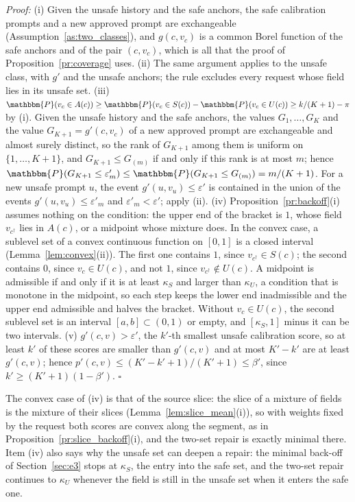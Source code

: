 \documentclass{article}
\newcommand{\PP}{\mathbbm{P}}
\theoremstyle{plain}
\theoremstyle{remark}
\begin{document}
\textit{Proof:}
(i) Given the unsafe history and the safe anchors, the safe calibration prompts and a new approved prompt are exchangeable
(Assumption~\ref{as:two_classes}), and $g(c,v_c)$ is a common Borel function of the safe anchors and of the pair $(c,v_c)$, which is all
that the proof of Proposition~\ref{pr:coverage} uses. (ii) The same argument applies to the unsafe class, with $g'$ and the unsafe anchors;
the rule excludes every request whose field lies in its unsafe set.
(iii) $\PP(v_c\in A(c))\ge\PP(v_c\in S(c))-\PP(v_c\in U(c))\ge k/(K+1)-\pi$ by (i). Given the unsafe history and the safe anchors, the
values $G_1,\dots,G_K$ and the value $G_{K+1}=g'(c,v_c)$ of a new approved prompt are exchangeable and almost surely distinct, so the rank
of $G_{K+1}$ among them is uniform on $\{1,\dots,K+1\}$, and $G_{K+1}\le G_{(m)}$ if and only if this rank is at most $m$; hence
$\PP(G_{K+1}\le\varepsilon'_m)\le\PP(G_{K+1}\le G_{(m)})=m/(K+1)$. For a new unsafe prompt $u$, the event $g'(u,v_u)\le\varepsilon'$ is contained
in the union of the events $g'(u,v_u)\le\varepsilon'_m$ and $\varepsilon'_m<\varepsilon'$; apply (ii).
(iv) Proposition~\ref{pr:backoff}(i) assumes nothing on the condition: the upper end of the bracket is $1$, whose field $v_{c^\dagger}$ lies
in $A(c)$, or a midpoint whose mixture does. In the convex case, a sublevel set of a convex continuous function on $[0,1]$ is a closed
interval (Lemma~\ref{lem:convex}(ii)). The first one contains $1$, since $v_{c^\dagger}\in S(c)$; the second contains $0$, since
$v_c\in U(c)$, and not $1$, since $v_{c^\dagger}\notin U(c)$. A midpoint is admissible if and only if it is at least $\kappa_S$ and larger
than $\kappa_U$, a condition that is monotone in the midpoint, so each step keeps the lower end inadmissible and the upper end
admissible and halves the bracket. Without $v_c\in U(c)$, the second sublevel set is an interval $[a,b]\subset(0,1)$ or empty, and
$[\kappa_S,1]$ minus it can be two intervals.
(v) $g'(c,v)>\varepsilon'$, the $k'$-th smallest unsafe calibration score, so at least $k'$ of these scores are smaller than $g'(c,v)$ and
at most $K'-k'$ are at least $g'(c,v)$; hence $p'(c,v)\le(K'-k'+1)/(K'+1)\le\beta'$, since $k'\ge(K'+1)(1-\beta')$. \hfill$\square$

The convex case of (iv) is that of the source slice: the slice of a mixture of fields is the mixture of their slices
(Lemma~\ref{lem:slice_mean}(i)), so with weights fixed by the request both scores are convex along the segment, as in
Proposition~\ref{pr:slice_backoff}(i), and the two-set repair is exactly minimal there. Item (iv) also says why the unsafe set can
deepen a repair: the minimal back-off of Section~\ref{sec:e3} stops at $\kappa_S$, the entry into the safe set, and the two-set repair
continues to $\kappa_U$ whenever the field is still in the unsafe set when it enters the safe one.
\end{document}
